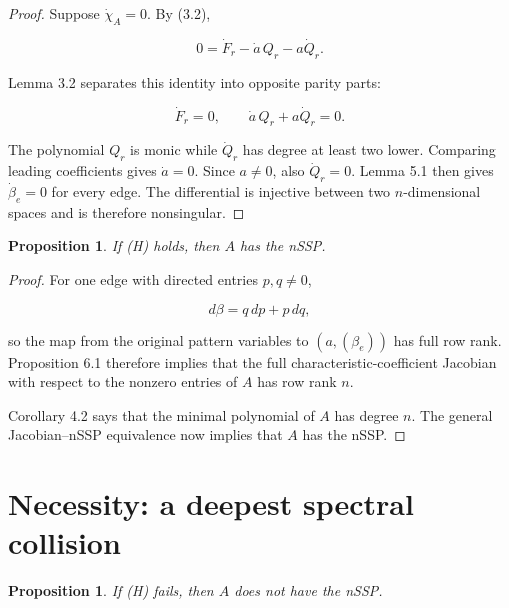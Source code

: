 \documentclass[11pt]{article}
\newtheorem{proposition}[theorem]{Proposition}
\theoremstyle{remark}
\begin{document}
\begin{proof}

Suppose $\dot\chi_A=0$. By (3.2),

\[
0=\dot F_r-\dot a\,Q_r-a\dot Q_r.
\tag{6.2}
\]

Lemma 3.2 separates this identity into opposite parity parts:

\[
\dot F_r=0,
\qquad
\dot a\,Q_r+a\dot Q_r=0.
\tag{6.3}
\]

The polynomial $Q_r$ is monic while $\dot Q_r$ has degree at least two lower. Comparing leading coefficients gives $\dot a=0$. Since $a\ne0$, also $\dot Q_r=0$. Lemma 5.1 then gives $\dot\beta_e=0$ for every edge. The differential is injective between two $n$-dimensional spaces and is therefore nonsingular.

\end{proof}

\begin{proposition}

If (H) holds, then $A$ has the nSSP.

\end{proposition}

\begin{proof}

For one edge with directed entries $p,q\ne0$,

\[
d\beta=q\,dp+p\,dq,
\]

so the map from the original pattern variables to $(a,(\beta_e))$ has full row rank. Proposition 6.1 therefore implies that the full characteristic-coefficient Jacobian with respect to the nonzero entries of $A$ has row rank $n$.

Corollary 4.2 says that the minimal polynomial of $A$ has degree $n$. The general Jacobian--nSSP equivalence \cite[Theorem 5.1]{ref1} now implies that $A$ has the nSSP.

\end{proof}

\section{Necessity: a deepest spectral collision}


\begin{proposition}

If (H) fails, then $A$ does not have the nSSP.

\end{proposition}
\end{document}
